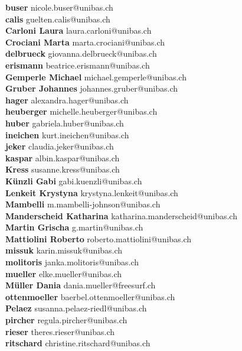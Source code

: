 \documentclass{scrartcl}
\begin{document}
\textbf{buser } nicole.buser@unibas.ch\\
\textbf{calis } guelten.calis@unibas.ch\\
\textbf{Carloni Laura } laura.carloni@unibas.ch\\
\textbf{Crociani Marta } marta.crociani@unibas.ch\\
\textbf{delbrueck } giovanna.delbrueck@unibas.ch\\
\textbf{erismann } beatrice.erismann@unibas.ch\\
\textbf{Gemperle Michael } michael.gemperle@unibas.ch\\
\textbf{Gruber Johannes } johannes.gruber@unibas.ch\\
\textbf{hager } alexandra.hager@unibas.ch\\
\textbf{heuberger } michelle.heuberger@unibas.ch\\
\textbf{huber } gabriela.huber@unibas.ch\\
\textbf{ineichen } kurt.ineichen@unibas.ch\\
\textbf{jeker } claudia.jeker@unibas.ch\\
\textbf{kaspar } albin.kaspar@unibas.ch\\
\textbf{Kress } susanne.kress@unibas.ch\\
\textbf{Künzli Gabi } gabi.kuenzli@unibas.ch\\
\textbf{Lenkeit Krystyna } krystyna.lenkeit@unibas.ch\\
\textbf{Mambelli } m.mambelli-johnson@unibas.ch\\
\textbf{Manderscheid Katharina } katharina.manderscheid@unibas.ch\\
\textbf{Martin Grischa } g.martin@unibas.ch\\
\textbf{Mattiolini Roberto } roberto.mattiolini@unibas.ch\\
\textbf{missuk } karin.missuk@unibas.ch\\
\textbf{molitoris } janka.molitoris@unibas.ch\\
\textbf{mueller } elke.mueller@unibas.ch\\
\textbf{Müller Dania } dania.mueller@freesurf.ch\\
\textbf{ottenmoeller } baerbel.ottenmoeller@unibas.ch\\
\textbf{Pelaez } susanna.pelaez-riedl@unibas.ch\\
\textbf{pircher } regula.pircher@unibas.ch\\
\textbf{rieser } theres.rieser@unibas.ch\\
\textbf{ritschard } christine.ritschard@unibas.ch\\
\end{document}
